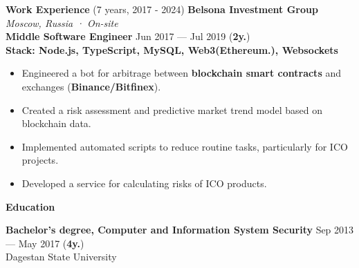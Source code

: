 \documentclass{resume}
\begin{document}
\begin{rSection}{\textbf{Work Experience} (7 years, 2017 - 2024) }
    \textbf{Belsona Investment Group} \hfill \textit{Moscow, Russia · On-site} \\
    \textbf{Middle Software Engineer}  \hfill Jun 2017 --- Jul 2019 ({\textbf{2y.}}) \\
    \textbf{Stack: Node.js, TypeScript, MySQL, Web3(Ethereum.), Websockets}
    \begin{itemize}
        \item Engineered a bot for arbitrage between \textbf{blockchain smart contracts} and exchanges (\textbf{Binance/Bitfinex})\@.
        \item Created a risk assessment and predictive market trend model based on blockchain data\@.
        \item Implemented automated scripts to reduce routine tasks, particularly for ICO projects\@.
        \item Developed a service for calculating risks of ICO products\@.
    \end{itemize}

\end{rSection}



\begin{rSection}{\textbf{Education}}

\textbf{Bachelor's degree, Computer and Information System Security} \hfill {Sep 2013 --- May 2017 ({\textbf{4y.}})} \\
	  Dagestan State University

\end{rSection}
\end{document}
